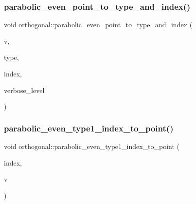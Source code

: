 \mbox{\label{classorthogonal_adc21e597558e245b7fe039e3033adcab}} 
\subsubsection{\texorpdfstring{parabolic\+\_\+even\+\_\+point\+\_\+to\+\_\+type\+\_\+and\+\_\+index()}{parabolic\_even\_point\_to\_type\_and\_index()}}
{\footnotesize\ttfamily void orthogonal\+::parabolic\+\_\+even\+\_\+point\+\_\+to\+\_\+type\+\_\+and\+\_\+index (\begin{DoxyParamCaption}\item[{\mbox{\hyperlink{galois_8h_a09fddde158a3a20bd2dcadb609de11dc}{I\+NT}} $\ast$}]{v,  }\item[{\mbox{\hyperlink{galois_8h_a09fddde158a3a20bd2dcadb609de11dc}{I\+NT}} \&}]{type,  }\item[{\mbox{\hyperlink{galois_8h_a09fddde158a3a20bd2dcadb609de11dc}{I\+NT}} \&}]{index,  }\item[{\mbox{\hyperlink{galois_8h_a09fddde158a3a20bd2dcadb609de11dc}{I\+NT}}}]{verbose\+\_\+level }\end{DoxyParamCaption})}

\mbox{\label{classorthogonal_a6646754b896f772146faceaa4100403f}} 
\subsubsection{\texorpdfstring{parabolic\+\_\+even\+\_\+type1\+\_\+index\+\_\+to\+\_\+point()}{parabolic\_even\_type1\_index\_to\_point()}}
{\footnotesize\ttfamily void orthogonal\+::parabolic\+\_\+even\+\_\+type1\+\_\+index\+\_\+to\+\_\+point (\begin{DoxyParamCaption}\item[{\mbox{\hyperlink{galois_8h_a09fddde158a3a20bd2dcadb609de11dc}{I\+NT}}}]{index,  }\item[{\mbox{\hyperlink{galois_8h_a09fddde158a3a20bd2dcadb609de11dc}{I\+NT}} $\ast$}]{v }\end{DoxyParamCaption})}

